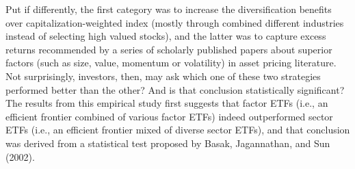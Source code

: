 Put if differently, the first category was to increase the diversification benefits over capitalization-weighted index (mostly through combined different industries instead of selecting high valued stocks), and the latter was to capture excess returns recommended by a series of scholarly published papers about superior factors (such as size, value, momentum or volatility) in asset pricing literature. Not surprisingly, investors, then, may ask which one of these two strategies performed better than the other? And is that conclusion statistically significant? The results from this empirical study first suggests that factor ETFs (i.e., an efficient frontier combined of various factor ETFs) indeed outperformed sector ETFs (i.e., an efficient frontier mixed of diverse sector ETFs), and that conclusion was derived from a statistical test proposed by Basak, Jagannathan, and Sun (2002).



